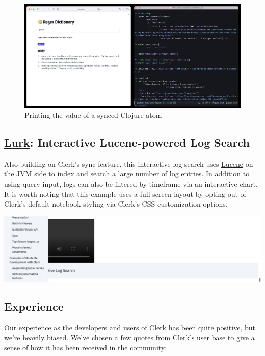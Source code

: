 \documentclass[sigconf,screen]{acmart}
\begin{document}
\begin{figure}[H]
\centering
\includegraphics{images/printing-the-value-of-a-synced-clojure-atom.png}
\caption{Printing the value of a synced Clojure atom}
\end{figure}

\hypertarget{id}{%
\subsection{\texorpdfstring{\href{https://github.com/nextjournal/lurk}{Lurk}: Interactive Lucene-powered Log Search}{Lurk: Interactive Lucene-powered Log Search}}\label{id}}

Also building on Clerk's sync feature, this interactive log search uses \href{https://lucene.apache.org/}{Lucene} on the JVM side to index and search a large number of log entries. In addition to using query input, logs can also be filtered by timeframe via an interactive chart. It is worth noting that this example uses a full-screen layout by opting out of Clerk's default notebook styling via Clerk's CSS customization options.

\includegraphics{images/result-anon-expr-5dsG7amjeS71pL625va49p93m7hFSo.png}

\hypertarget{id}{%
\subsection{Experience}\label{id}}

Our experience as the developers and users of Clerk has been quite positive, but we're heavily biased. We've chosen a few quotes from Clerk's user base to give a sense of how it has been received in the community:
\end{document}
